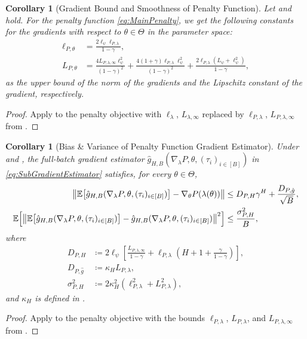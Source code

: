 \documentclass{article}
\theoremstyle{plain}
\newtheorem{corollary}[theorem]{Corollary}
\theoremstyle{definition}
\theoremstyle{remark}
\newcommand{\Exp}[1]{{ \mathbb{E}}\!\left[#1\right]}
\DeclarePairedDelimiter{\norm}{\lVert}{\rVert}
\newcommand{\define}{\coloneqq}
\newcommand{\setm}[1]{[#1]}
\def\gApprox{{\hat{g}}}
\begin{document}
\begin{corollary}[Gradient Bound and Smoothness of Penalty Function]
 \label{cor:GradientBoundSmoothnessPenalty}
 Let
  and
  hold.
 For the penalty function \eqref{eq:MainPenalty}, we get the
 following constants for the gradients with respect to
 $\theta \in \Theta$ in the parameter space:
 \begin{align*}
  \ell_{P,\theta}
   & =\frac{2\ell_\psi\ell_{P,\lambda}}{1-\gamma},          \\
  L_{P,\theta}
   & =\frac{4L_{P,\lambda,\infty}\ell_\psi^2}{(1-\gamma)^2}
  +\frac{4(1+\gamma)\ell_{P,\lambda}\ell_\psi^2}{(1-\gamma)^2}
  +\frac{2\ell_{P,\lambda}(L_\psi+\ell_\psi^2)}{1-\gamma},
 \end{align*}
 as the upper bound of the norm of the gradients
 and the Lipschitz constant of the gradient, respectively.
\end{corollary}
\begin{proof}
 Apply  to the penalty objective
 with $\ell_\lambda$, $L_{\lambda,\infty}$ replaced by
 $\ell_{P,\lambda}$, $L_{P,\lambda,\infty}$ from
 .
\end{proof}

\begin{corollary}[Bias \& Variance of Penalty Function Gradient Estimator]
 \label{lem:PenaltyBiasVarianceGradientEstimator}
 Under  and , the full-batch
 gradient estimator
 $\gApprox_{H,B}(\nabla_\lambda P,\theta,
  (\tau_i)_{i\in\setm{B}})$ in \eqref{eq:SubGradientEstimator} satisfies,
 for every $\theta\in\Theta$,
 \begin{align*}
  \norm*{\Exp{\gApprox_{H,B}(\nabla_\lambda P,\theta,
   (\tau_i)_{i\in\setm{B}})}-\nabla_\theta P(\lambda(\theta))}
   & \leq D_{P,H}\gamma^H+\frac{D_{P,\gApprox}}{\sqrt B}, \\
  \Exp{\norm*{\Exp{\gApprox_{H,B}(\nabla_\lambda P,\theta,
   (\tau_i)_{i\in\setm{B}})}
   -\gApprox_{H,B}(\nabla_\lambda P,\theta,
   (\tau_i)_{i\in\setm{B}})}^2}
   & \leq\frac{\sigma_{P,H}^2}{B},
 \end{align*}
 where
 \begin{align*}
  D_{P,H}        & \define 2\ell_\psi\left[
   \frac{L_{P,\lambda,\infty}}{1-\gamma}
  +\ell_{P,\lambda}\left(H+1+\frac{\gamma}{1-\gamma}\right)\right], \\
  D_{P,\gApprox} & \define\kappa_H L_{P,\lambda},                   \\
  \sigma_{P,H}^2 & \define
  2\kappa_H^2\left(\ell_{P,\lambda}^2+L_{P,\lambda}^2\right),
 \end{align*}
 and $\kappa_H$ is defined in .
\end{corollary}
\begin{proof}
 Apply  to the penalty objective
 with the bounds $\ell_{P,\lambda}$, $L_{P,\lambda}$, and
 $L_{P,\lambda,\infty}$ from
 .
\end{proof}
\end{document}
